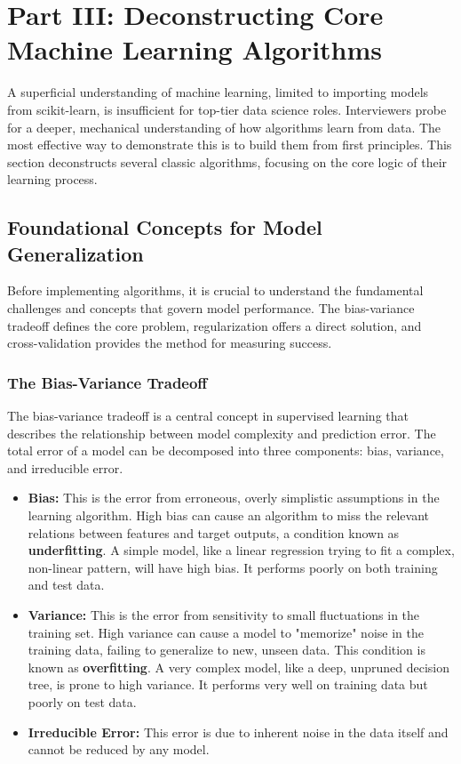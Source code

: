\documentclass[11pt,a4paper]{article}
\begin{document}
\section{Part III: Deconstructing Core Machine Learning Algorithms}

A superficial understanding of machine learning, limited to importing models from scikit-learn, is insufficient for top-tier data science roles. Interviewers probe for a deeper, mechanical understanding of how algorithms learn from data. The most effective way to demonstrate this is to build them from first principles. This section deconstructs several classic algorithms, focusing on the core logic of their learning process.

\subsection{Foundational Concepts for Model Generalization}

Before implementing algorithms, it is crucial to understand the fundamental challenges and concepts that govern model performance. The bias-variance tradeoff defines the core problem, regularization offers a direct solution, and cross-validation provides the method for measuring success.

\subsubsection{The Bias-Variance Tradeoff}

The bias-variance tradeoff is a central concept in supervised learning that describes the relationship between model complexity and prediction error. The total error of a model can be decomposed into three components: bias, variance, and irreducible error.

\begin{itemize}
    \item \textbf{Bias:} This is the error from erroneous, overly simplistic assumptions in the learning algorithm. High bias can cause an algorithm to miss the relevant relations between features and target outputs, a condition known as \textbf{underfitting}. A simple model, like a linear regression trying to fit a complex, non-linear pattern, will have high bias. It performs poorly on both training and test data.
    \item \textbf{Variance:} This is the error from sensitivity to small fluctuations in the training set. High variance can cause a model to "memorize" noise in the training data, failing to generalize to new, unseen data. This condition is known as \textbf{overfitting}. A very complex model, like a deep, unpruned decision tree, is prone to high variance. It performs very well on training data but poorly on test data.
    \item \textbf{Irreducible Error:} This error is due to inherent noise in the data itself and cannot be reduced by any model.
\end{itemize}
\end{document}
